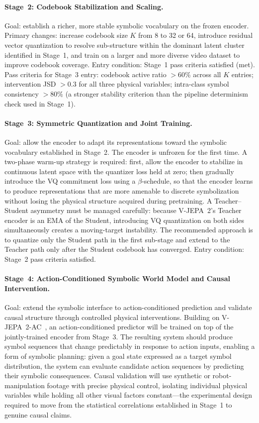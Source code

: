 \documentclass{article}
\begin{document}
\paragraph{Stage~2: Codebook Stabilization and Scaling.}
Goal: establish a richer, more stable symbolic vocabulary on the
frozen encoder.
Primary changes: increase codebook size $K$ from 8 to 32 or 64,
introduce residual vector quantization to resolve sub-structure within
the dominant latent cluster identified in Stage~1, and train on a
larger and more diverse video dataset to improve codebook coverage.
Entry condition: Stage~1 pass criteria satisfied (met).
Pass criteria for Stage~3 entry: codebook active ratio $> 60\%$
across all $K$ entries; intervention JSD $> 0.3$ for all three
physical variables; intra-class symbol consistency $> 80\%$ (a
stronger stability criterion than the pipeline determinism check used
in Stage~1).

\paragraph{Stage~3: Symmetric Quantization and Joint Training.}
Goal: allow the encoder to adapt its representations toward the
symbolic vocabulary established in Stage~2.
The encoder is unfrozen for the first time.
A two-phase warm-up strategy is required: first, allow the encoder to
stabilize in continuous latent space with the quantizer loss held at
zero; then gradually introduce the VQ commitment loss using a
$\beta$-schedule, so that the encoder learns to produce representations
that are more amenable to discrete symbolization without losing the
physical structure acquired during pretraining.
A Teacher--Student asymmetry must be managed carefully: because
V-JEPA~2's Teacher encoder is an EMA of the Student, introducing VQ
quantization on both sides simultaneously creates a moving-target
instability.
The recommended approach is to quantize only the Student path in the
first sub-stage and extend to the Teacher path only after the Student
codebook has converged.
Entry condition: Stage~2 pass criteria satisfied.

\paragraph{Stage~4: Action-Conditioned Symbolic World Model and
Causal Intervention.}
Goal: extend the symbolic interface to action-conditioned prediction
and validate causal structure through controlled physical
interventions.
Building on V-JEPA~2-AC~\cite{assran2025vjepa2}, an action-conditioned
predictor will be trained on top of the jointly-trained encoder from
Stage~3.
The resulting system should produce symbol sequences that change
predictably in response to action inputs, enabling a form of
symbolic planning: given a goal state expressed as a target symbol
distribution, the system can evaluate candidate action sequences by
predicting their symbolic consequences.
Causal validation will use synthetic or robot-manipulation footage
with precise physical control, isolating individual physical variables
while holding all other visual factors constant---the experimental
design required to move from the statistical correlations established
in Stage~1 to genuine causal claims.
\end{document}
